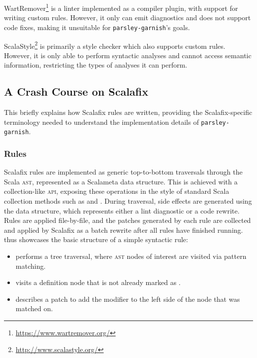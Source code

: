 \documentclass[../../main.tex]{subfiles}
\begin{document}
WartRemover\footnote{\url{https://www.wartremover.org/}} is a linter implemented as a compiler plugin, with support for writing custom rules.
However, it only can emit diagnostics and does not support code fixes, making it unsuitable for \texttt{parsley-garnish}'s goals.

ScalaStyle\footnote{\url{http://www.scalastyle.org/}} is primarily a style checker which also supports custom rules.
However, it is only able to perform syntactic analyses and cannot access semantic information, restricting the types of analyses it can perform.


\subsection{A Crash Course on Scalafix}\label{sec:scalafix}
This  briefly explains how Scalafix rules are written,
providing the Scalafix-specific terminology needed to understand the implementation details of \texttt{parsley-garnish}.

\subsubsection{Rules}
Scalafix rules are implemented as generic top-to-bottom traversals through the Scala \textsc{ast}, represented as a Scalameta  data structure.
This is achieved with a collection-like \textsc{api}, exposing these operations in the style of standard Scala collection methods such as  and .
During traversal, side effects are generated using the  data structure, which represents either a lint diagnostic or a code rewrite.
Rules are applied file-by-file, and the patches generated by each rule are collected and applied by Scalafix as a batch rewrite after all rules have finished running.
 thus showcases the basic structure of a simple syntactic rule:
\begin{itemize}
  \item {} performs a tree traversal, where \textsc{ast} nodes of interest are visited via pattern matching.
  \item {} visits a  definition node that is not already marked as .
  \item {} describes a patch to add the  modifier to the left side of the node that was matched on.
\end{itemize}
\end{document}
